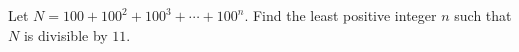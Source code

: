 Let $N=100+100^2+100^3+\cdots+100^n$. Find the least positive integer $n$ such that $N$ is divisible by $11$.
